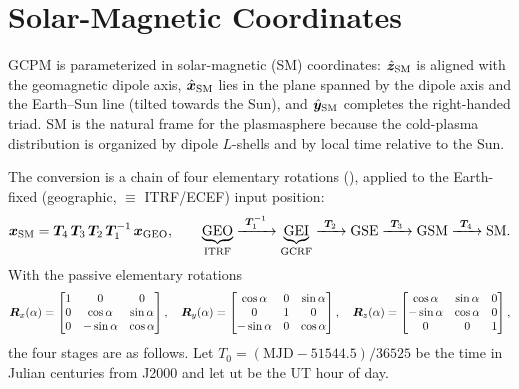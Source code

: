 \section{Solar-Magnetic Coordinates}
\label{sec:iono-sm}

GCPM is parameterized in solar-magnetic (SM) coordinates: $\hat{\bm{z}}_\mathrm{SM}$
is aligned with the geomagnetic dipole axis, $\hat{\bm{x}}_\mathrm{SM}$ lies in the
plane spanned by the dipole axis and the Earth--Sun line (tilted towards the
Sun), and $\hat{\bm{y}}_\mathrm{SM}$ completes the right-handed triad.  SM is the
natural frame for the plasmasphere because the cold-plasma distribution is
organized by dipole $L$-shells and by local time relative to the Sun.

The conversion is a chain of four elementary rotations
(), applied to the
Earth-fixed (geographic,  $\equiv$ ITRF/ECEF) input position:
%
\begin{equation}
  \label{eq:iono-sm-chain}
  \bm{x}_\mathrm{SM}
  = \bm{T}_4\,\bm{T}_3\,\bm{T}_2\,\bm{T}_1^{-1}\,\bm{x}_\mathrm{GEO},
  \qquad
  \underbrace{\mathrm{GEO}}_{\text{ITRF}}
  \xrightarrow{\ \bm{T}_1^{-1}\ } \underbrace{\mathrm{GEI}}_{\text{GCRF}}
  \xrightarrow{\ \bm{T}_2\ } \mathrm{GSE}
  \xrightarrow{\ \bm{T}_3\ } \mathrm{GSM}
  \xrightarrow{\ \bm{T}_4\ } \mathrm{SM} .
\end{equation}
%
With the passive elementary rotations
%
\begin{equation}
  \bm{R}_x(\alpha) =
  \begin{bmatrix} 1 & 0 & 0 \\ 0 & \cos\alpha & \sin\alpha \\ 0 & -\sin\alpha & \cos\alpha \end{bmatrix},
  \quad
  \bm{R}_y(\alpha) =
  \begin{bmatrix} \cos\alpha & 0 & \sin\alpha \\ 0 & 1 & 0 \\ -\sin\alpha & 0 & \cos\alpha \end{bmatrix},
  \quad
  \bm{R}_z(\alpha) =
  \begin{bmatrix} \cos\alpha & \sin\alpha & 0 \\ -\sin\alpha & \cos\alpha & 0 \\ 0 & 0 & 1 \end{bmatrix},
\end{equation}
%
the four stages are as follows.  Let $T_0 = (\mathrm{MJD} - 51544.5)/36525$ be
the time in Julian centuries from J2000 and let $\mathrm{ut}$ be the UT hour of
day.

